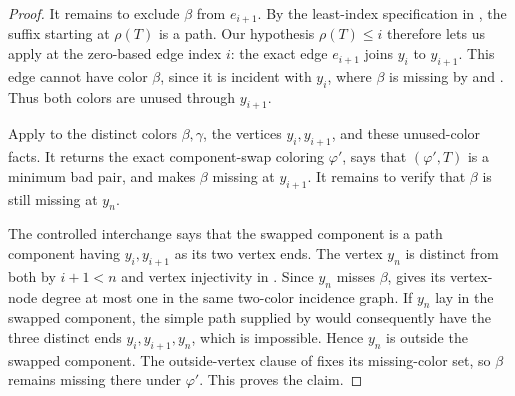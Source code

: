 \begin{proof}
It remains to exclude \(\beta\) from \(e_{i+1}\).  By the
least-index specification in , the suffix
starting at \(\rho(T)\) is a path.  Our hypothesis \(\rho(T)\leq i\)
therefore lets us apply  at the zero-based
edge index \(i\): the exact edge \(e_{i+1}\) joins \(y_i\) to
\(y_{i+1}\).  This edge cannot have color \(\beta\), since it is
incident with \(y_i\), where \(\beta\) is missing by
 and .  Thus both colors
are unused through \(y_{i+1}\).

Apply  to the distinct colors
\(\beta,\gamma\), the vertices \(y_i,y_{i+1}\), and these unused-color
facts.  It returns the exact component-swap coloring \(\varphi'\), says
that \((\varphi',T)\) is a minimum bad pair, and makes \(\beta\) missing
at \(y_{i+1}\).  It remains to verify that \(\beta\) is still missing
at \(y_n\).

The controlled interchange says that the swapped component is a path
component having \(y_i,y_{i+1}\) as its two vertex ends.  The vertex
\(y_n\) is distinct from both by \(i+1<n\) and vertex injectivity in
.  Since \(y_n\) misses \(\beta\),
 gives its vertex-node degree at
most one in the same two-color incidence graph.  If \(y_n\) lay in the
swapped component, the simple path supplied by
 would consequently have the
three distinct ends \(y_i,y_{i+1},y_n\), which is impossible.  Hence
\(y_n\) is outside the swapped component.  The outside-vertex clause of
 fixes its missing-color
set, so \(\beta\) remains missing there under \(\varphi'\).  This proves
the claim.
\end{proof}
